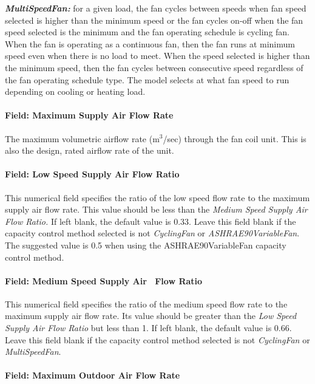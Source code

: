 \textbf{\emph{MultiSpeedFan:}} for a given load, the fan cycles between speeds when fan speed selected is higher than the minimum speed or the fan cycles on-off when the fan speed selected is the minimum and the fan operating schedule is cycling fan. When the fan is operating as a continuous fan, then the fan runs at minimum speed even when there is no load to meet. When the speed selected is higher than the minimum speed, then the fan cycles between consecutive speed regardless of the fan operating schedule type. The model selects at what fan speed to run depending on cooling or heating load.

\paragraph{Field: Maximum Supply Air Flow Rate}\label{field-maximum-supply-air-flow-rate}

The maximum volumetric airflow rate (m\(^{3}\)/sec) through the fan coil unit. This is also the design, rated airflow rate of the unit.

\paragraph{Field: Low Speed Supply Air Flow Ratio}\label{field-low-speed-supply-air-flow-ratio-000}

This numerical field specifies the ratio of the low speed flow rate to the maximum supply air flow rate. This value should be less than the \emph{Medium Speed Supply Air Flow Ratio.} If left blank, the default value is 0.33. Leave this field blank if the capacity control method selected is not \emph{CyclingFan} or \emph{ASHRAE90VariableFan}. The suggested value is 0.5 when using the ASHRAE90VariableFan capacity control method.

\paragraph{Field: Medium Speed Supply Air~ Flow Ratio}\label{field-medium-speed-supply-air-flow-ratio-000}

This numerical field specifies the ratio of the medium speed flow rate to the maximum supply air flow rate. Its value should be greater than the \emph{Low Speed Supply Air Flow Ratio} but less than 1. If left blank, the default value is 0.66. Leave this field blank if the capacity control method selected is not \emph{CyclingFan} or \emph{MultiSpeedFan}.

\paragraph{Field: Maximum Outdoor Air Flow Rate}\label{field-maximum-outdoor-air-flow-rate-002}

